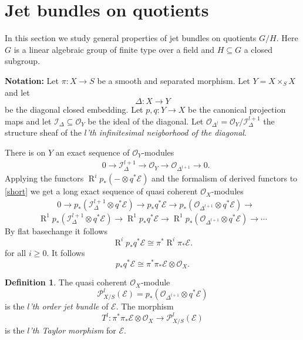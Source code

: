 \documentclass{amsart}
\theoremstyle{plain}
\theoremstyle{definition}
\newtheorem{definition}[theorem]{Definition}
\theoremstyle{remark}
\numberwithin{equation}{theorem}
\begin{document}
\section{Jet bundles on quotients}

In this section we study general properties of jet bundles on
quotients $G/H$. Here $G$ is a linear algebraic group of finite type
over a field and $H\subseteq G$ a closed subgroup.

\textbf{Notation:} Let $\pi:X\rightarrow S$ be a smooth
and separated morphism. Let $Y=X\times_S X$ and let 
\[ \Delta:X\rightarrow Y \]
be the diagonal closed embedding. Let $p,q:Y\rightarrow X$ be the
canonical projection maps and let ${\mathcal{I}}_\Delta \subseteq {\mathcal{O} }_Y$ be the
ideal of the diagonal. Let ${\mathcal{O} }_{\Delta^l}={\mathcal{O} }_Y/{\mathcal{I}}_\Delta^{l+1}$ the
structure sheaf of the \emph{$l$'th infinitesimal neigborhood of the diagonal}.

There is on $Y$ an exact sequence of ${\mathcal{O} }_Y$-modules
\begin{align}
&\label{short} 0\rightarrow {\mathcal{I}}_{\Delta}^{l+1}\rightarrow {\mathcal{O} }_Y
\rightarrow {\mathcal{O} }_{\Delta^{l+1}} \rightarrow 0.
\end{align}
Applying the functors ${\operatorname{R} }^ip_*(-\otimes q^*{\mathcal{E}})$ and the formalism of
derived functors to \ref{short} we get a long exact sequence of quasi coherent ${\mathcal{O} }_X$-modules
\begin{align}
&\label{longexact} 0\rightarrow p_*({\mathcal{I}}_{\Delta}^{l+1}\otimes q^*{\mathcal{E}})\rightarrow
p_*q^*{\mathcal{E}} \rightarrow p_*({\mathcal{O} }_{\Delta^{l+1}}\otimes q^*{\mathcal{E}}) \rightarrow
\end{align}
\[{\operatorname{R} }^1p_*({\mathcal{I}}_{\Delta}^{l+1}\otimes q^*{\mathcal{E}})\rightarrow {\operatorname{R} }^1p_*q^*{\mathcal{E}}
\rightarrow {\operatorname{R} }^1p_*({\mathcal{O} }_{\Delta^{l+1}}\otimes q^*{\mathcal{E}}) \rightarrow \cdots
\]
By flat basechange it follows
\[ {\operatorname{R} }^ip_*q^*{\mathcal{E}}\cong \pi^*{\operatorname{R} }^i\pi_*{\mathcal{E}}. \]
for all $i\geq 0$.
It follows 
\[ p_*q^*{\mathcal{E}}\cong \pi^*\pi_*{\mathcal{E}}\otimes {\mathcal{O} }_X.\]

\begin{definition} \label{jets} The quasi coherent ${\mathcal{O} }_X$-module
\[ {\mathcal{P} }^l_{X/S}({\mathcal{E}})=p_*({\mathcal{O} }_{\Delta^{l+1}}\otimes q^*{\mathcal{E}}) \]
is the \emph{$l$'th order jet bundle} of ${\mathcal{E}}$. The morphism
\[ T^l:\pi^*\pi_*{\mathcal{E}}\otimes {\mathcal{O} }_X\rightarrow {\mathcal{P} }^l_{X/S}({\mathcal{E}}) \]
is the \emph{$l$'th Taylor morphism} for ${\mathcal{E}}$.
\end{definition}
\end{document}
